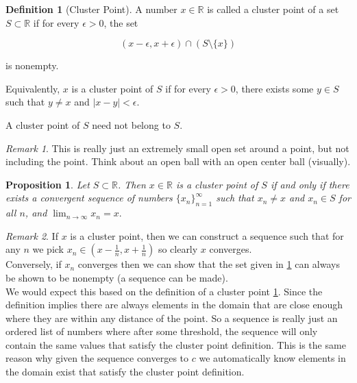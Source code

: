 \documentclass{article}
\newtheorem{proposition}{Proposition}[section]
\theoremstyle{definition}
\newtheorem{definition}{Definition}[section]
\theoremstyle{remark}
\newtheorem{remark}{Remark}[section]
\begin{document}
\begin{definition}[Cluster Point]\label{def:cluster_point}
A number \( x \in \mathbb{R} \) is called a cluster point of a set \( S \subset \mathbb{R} \) if for every \( \epsilon > 0 \), the set  

\[
(x - \epsilon, x + \epsilon) \cap (S \setminus \{x\})
\]

is nonempty.  

Equivalently, \( x \) is a cluster point of \( S \) if for every \( \epsilon > 0 \), there exists some \( y \in S \) such that \( y \neq x \) and \( |x - y| < \epsilon \).  

A cluster point of \( S \) need not belong to \( S \).
\end{definition}

\begin{remark}
This is really just an extremely small open set around a point, but not including the point. 
Think about an open ball with an open center ball (visually).
\end{remark}

\vspace{.5cm}
\begin{proposition}
Let $S \subset \mathbb{R}$. Then $x \in \mathbb{R}$ is a cluster point of $S$ if and only if there exists a convergent sequence of numbers $\{x_n\}_{n=1}^{\infty}$ such that $x_n \neq x$ and $x_n \in S$ for all $n$, and 
\(
\lim_{n\to\infty} x_n = x.
\)
\end{proposition}
\begin{remark}
If $x$ is a cluster point, then we can construct a sequence such that for any $n$ we pick $x_n \in (x- \frac{1}{n}, x+ \frac{1}{n})$ so clearly $x$ converges. \\
\indent Conversely, if $x_n$ converges then we can show that the set given in \ref{def:cluster_point} can always be shown to be nonempty (a sequence can be made).\\
\indent We would expect this based on the definition of a cluster point \ref{def:cluster_point}. Since the definition implies
there are always elements in the domain that are close enough where they are within any distance of the point. So 
a sequence is really just an ordered list of numbers where after some threshold, the sequence will only contain
the same values that satisfy the cluster point definition. This is the same reason why given the sequence converges to $c$ 
we automatically know elements in the domain exist that satisfy the cluster point definition.
\end{remark}
\end{document}

